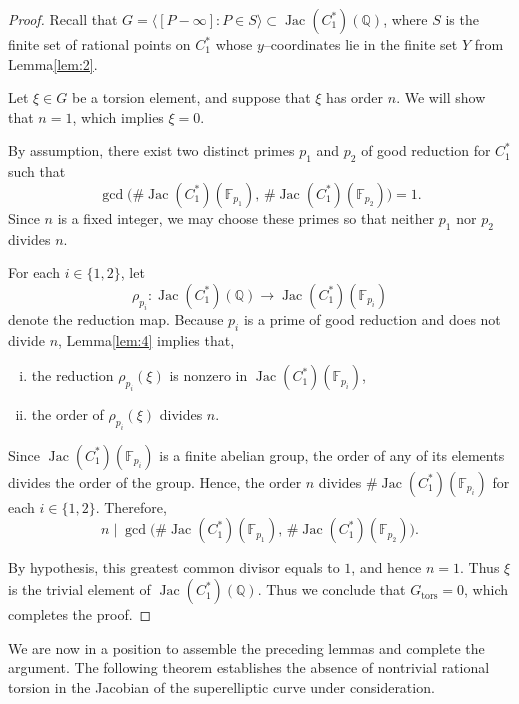 \documentclass[12pt, reqno]{amsart}
\numberwithin{equation}{section}
\theoremstyle{definition}
\theoremstyle{nodefstyle}
\newcommand{\Jac}{\operatorname{Jac}}
\newcommand{\tors}{\operatorname{tors}}
\begin{document}
\begin{proof}
Recall that $G=\big\langle [P-\infty] : P\in S \big\rangle \subset \Jac(C_1^*)(\mathbb{Q})$,
where $S$ is the finite set of rational points on $C_1^*$ whose $y$--coordinates lie in the finite set $Y$ from Lemma\autoref{lem:2}.

Let $\xi \in G$ be a torsion element, and suppose that $\xi$ has order $n$. 
We will show that $n=1$, which implies $\xi=0$.

By assumption, there exist two distinct primes $p_1$ and $p_2$ of good reduction for $C_1^*$ such that
\[
\gcd\!\bigl(\#\Jac(C_1^*)(\mathbb{F}_{p_1}),\,\#\Jac(C_1^*)(\mathbb{F}_{p_2})\bigr)=1.
\]
Since $n$ is a fixed integer, we may choose these primes so that neither $p_1$ nor $p_2$ divides $n$.

For each $i\in\{1,2\}$, let
\[
\rho_{p_i} : \Jac(C_1^*)(\mathbb{Q}) \longrightarrow \Jac(C_1^*)(\mathbb{F}_{p_i})
\]
denote the reduction map. 
Because $p_i$ is a prime of good reduction and does not divide $n$, Lemma\autoref{lem:4} implies that,
\begin{enumerate}[i.]
\item the reduction $\rho_{p_i}(\xi)$ is nonzero in $\Jac(C_1^*)(\mathbb{F}_{p_i})$,
\item the order of $\rho_{p_i}(\xi)$ divides $n$.
\end{enumerate}

Since $\Jac(C_1^*)(\mathbb{F}_{p_i})$ is a finite abelian group, the order of any of its elements divides the order of the group. 
Hence, the order $n$ divides $\#\Jac(C_1^*)(\mathbb{F}_{p_i})$ for each $i\in\{1,2\}$. 
Therefore,
\[
n \mid \gcd\!\bigl(\#\Jac(C_1^*)(\mathbb{F}_{p_1}),\,\#\Jac(C_1^*)(\mathbb{F}_{p_2})\bigr).
\]

By hypothesis, this greatest common divisor equals to $1$, and hence $n=1$. 
Thus $\xi$ is the trivial element of $\Jac(C_1^*)(\mathbb{Q})$. Thus we conclude that $G_{\tors}=0$, which completes the proof.
\end{proof}

We are now in a position to assemble the preceding lemmas and complete the argument. The following theorem establishes the absence of nontrivial rational torsion in the Jacobian of the superelliptic curve under consideration.
\end{document}

